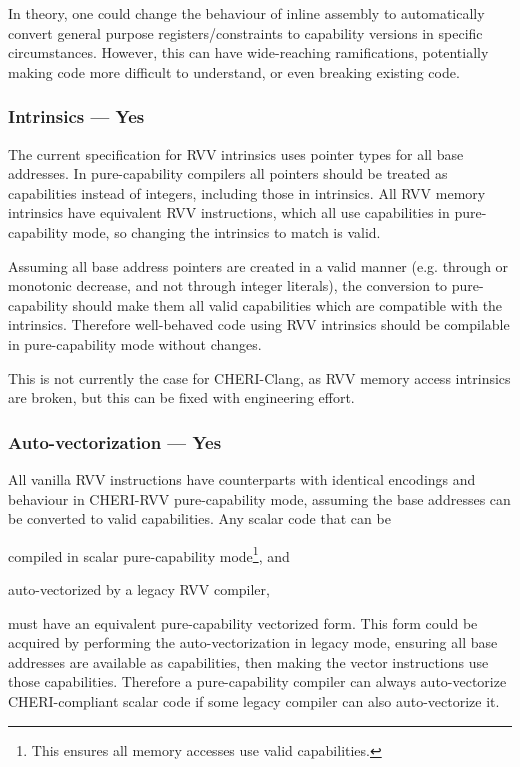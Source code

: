 In theory, one could change the behaviour of inline assembly to automatically convert general purpose registers/constraints to capability versions in specific circumstances.
However, this can have wide-reaching ramifications, potentially making code more difficult to understand, or even breaking existing code.

\subsubsection*{Intrinsics --- Yes}
The current specification for RVV intrinsics uses pointer types for all base addresses\cite{specification-RVV-intrinsics}.
In pure-capability compilers all pointers should be treated as capabilities instead of integers, including those in intrinsics.
All RVV memory intrinsics have equivalent RVV instructions, which all use capabilities in pure-capability mode, so changing the intrinsics to match is valid.

Assuming all base address pointers are created in a valid manner (e.g. through  or monotonic decrease, and not through integer literals), the conversion to pure-capability should make them all valid capabilities which are compatible with the intrinsics.
Therefore well-behaved code using RVV intrinsics should be compilable in pure-capability mode without changes.

This is not currently the case for CHERI-Clang, as RVV memory access intrinsics are broken, but this can be fixed with engineering effort.

\subsubsection*{Auto-vectorization --- Yes}
All vanilla RVV instructions have counterparts with identical encodings and behaviour in CHERI-RVV pure-capability mode, assuming the base addresses can be converted to valid capabilities.
Any scalar code that can be 
\begin{enumerate*}[label=\alph*)]
    \item compiled in scalar pure-capability mode\footnote{This ensures all memory accesses use valid capabilities.}, and
    \item auto-vectorized by a legacy RVV compiler,
\end{enumerate*}
must have an equivalent pure-capability vectorized form.
This form could be acquired by performing the auto-vectorization in legacy mode, ensuring all base addresses are available as capabilities, then making the vector instructions use those capabilities.
Therefore a pure-capability compiler can always auto-vectorize CHERI-compliant scalar code if some legacy compiler can also auto-vectorize it.

